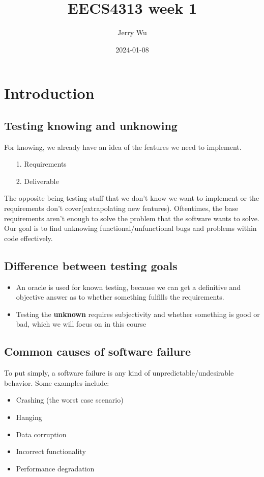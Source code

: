 \documentclass[12pt]{book}
\title{EECS4313 week 1}
\author{Jerry Wu}
\date{2024-01-08}
\begin{document}
\maketitle
\tableofcontents

\chapter{Introduction}

\section*{Testing knowing and unknowing}
For knowing, we already have an idea of the features we need to implement.
\begin{itemize}
  \item[1.] Requirements
  \item[2.] Deliverable
\end{itemize}

The opposite being testing stuff that we don't know we want to implement or the requirements don't cover(extrapolating new features). Oftentimes, the base requirements aren't enough to solve the problem that the software wants to solve.\\

Our goal is to find unknowing functional/unfunctional bugs and problems within code effectively.

\section*{Difference between testing goals}
\begin{itemize}
  \item An oracle is used for known testing, because we can get a definitive and objective answer as to whether something fulfills the requirements.
  \item Testing the \textbf{unknown} requires subjectivity and whether something is good or bad, which we will focus on in this course
\end{itemize}
\newpage
\section*{Common causes of software failure}
To put simply, a software failure is any kind of unpredictable/undesirable behavior. Some examples include:

\begin{itemize}
  \item Crashing (the worst case scenario)
  \item Hanging
  \item Data corruption
  \item Incorrect functionality
  \item Performance degradation
\end{itemize}
\end{document}
